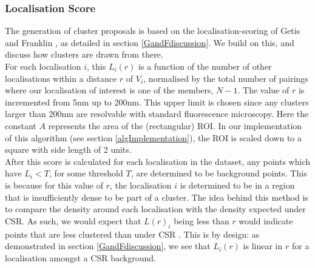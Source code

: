 \documentclass[11pt]{article}
\begin{document}
\subsubsection{Localisation Score} \label{localisationScore}


The generation of cluster proposals is based on the localisation-scoring of Getis and Franklin \cite{getisAndFranklin}, as detailed in section \ref{GandFdiscussion}. We build on this, and discuss how clusters are drawn from there.\\



For each localisation $i$, this $L_i(r)$ is a function of the number of other localisations within a distance $r$ of $V_i$, normalised by the total number of pairings where our localisation of interest is one of the members, $N-1$.  The value of $r$ is incremented from 5nm up to 200nm. This upper limit is chosen since any clusters larger than 200nm are resolvable with standard fluorescence microscopy\cite{Rubin-Delanchy2015}. Here the constant $A$ represents the area of the (rectangular) ROI. In our implementation of this algorithm (see section \ref{algImplementation}), the ROI is scaled down to a square with side length of 2 units. \\

After this score is calculated for each localisation in the dataset, any points which have $L_i < T$, for some threshold $T$, are determined to be background points. This is because for this value of $r$, the localisation $i$ is determined to be in a region that is insufficiently dense to be part of a cluster. The idea behind this method is to compare the density around each localisation with the density expected under CSR. As such, we would expect that $L(r)_i$ being less than $r$ would indicate points that are less clustered than under CSR \cite{Rubin-Delanchy2015}. This is by design: as demonstrated in section \ref{GandFdiscussion}, we see that $L_i(r)$ is linear in $r$ for a localisation amongst a CSR background. \\
\end{document}

